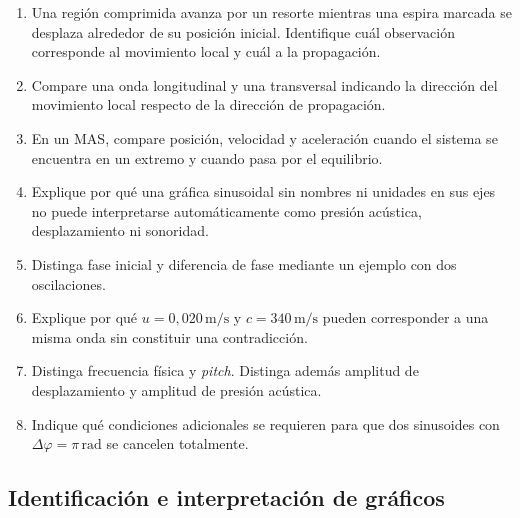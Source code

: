 \begin{enumerate}[label=\textbf{C\arabic*.},leftmargin=*]
    \item Una región comprimida avanza por un resorte mientras una espira
    marcada se desplaza alrededor de su posición inicial. Identifique cuál
    observación corresponde al movimiento local y cuál a la propagación.

    \item Compare una onda longitudinal y una transversal indicando la
    dirección del movimiento local respecto de la dirección de propagación.

    \item En un MAS, compare posición, velocidad y aceleración cuando el
    sistema se encuentra en un extremo y cuando pasa por el equilibrio.

    \item Explique por qué una gráfica sinusoidal sin nombres ni unidades en
    sus ejes no puede interpretarse automáticamente como presión acústica,
    desplazamiento ni sonoridad.

    \item Distinga fase inicial y diferencia de fase mediante un ejemplo con
    dos oscilaciones.

    \item Explique por qué \(u=0{,}020\,\text{m}/\text{s}\) y
    \(c=340\,\text{m}/\text{s}\) pueden corresponder a una misma onda sin
    constituir una contradicción.

    \item Distinga frecuencia física y \emph{pitch}. Distinga además amplitud
    de desplazamiento y amplitud de presión acústica.

    \item Indique qué condiciones adicionales se requieren para que dos
    sinusoides con \(\Delta\varphi=\pi\,\text{rad}\) se cancelen totalmente.
\end{enumerate}

\subsection*{Identificación e interpretación de gráficos}

